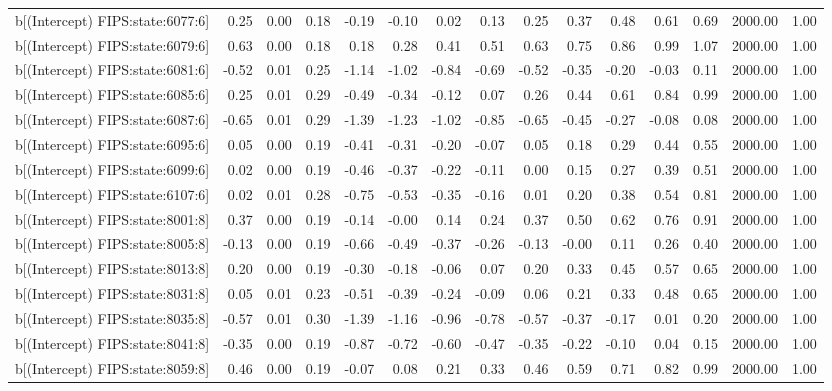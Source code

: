 \begin{table}[ht]
\begin{tabular}{rrrrrrrrrrrrrrr}
  b[(Intercept) FIPS:state:6077:6] & 0.25 & 0.00 & 0.18 & -0.19 & -0.10 & 0.02 & 0.13 & 0.25 & 0.37 & 0.48 & 0.61 & 0.69 & 2000.00 & 1.00 \\ 
  b[(Intercept) FIPS:state:6079:6] & 0.63 & 0.00 & 0.18 & 0.18 & 0.28 & 0.41 & 0.51 & 0.63 & 0.75 & 0.86 & 0.99 & 1.07 & 2000.00 & 1.00 \\ 
  b[(Intercept) FIPS:state:6081:6] & -0.52 & 0.01 & 0.25 & -1.14 & -1.02 & -0.84 & -0.69 & -0.52 & -0.35 & -0.20 & -0.03 & 0.11 & 2000.00 & 1.00 \\ 
  b[(Intercept) FIPS:state:6085:6] & 0.25 & 0.01 & 0.29 & -0.49 & -0.34 & -0.12 & 0.07 & 0.26 & 0.44 & 0.61 & 0.84 & 0.99 & 2000.00 & 1.00 \\ 
  b[(Intercept) FIPS:state:6087:6] & -0.65 & 0.01 & 0.29 & -1.39 & -1.23 & -1.02 & -0.85 & -0.65 & -0.45 & -0.27 & -0.08 & 0.08 & 2000.00 & 1.00 \\ 
  b[(Intercept) FIPS:state:6095:6] & 0.05 & 0.00 & 0.19 & -0.41 & -0.31 & -0.20 & -0.07 & 0.05 & 0.18 & 0.29 & 0.44 & 0.55 & 2000.00 & 1.00 \\ 
  b[(Intercept) FIPS:state:6099:6] & 0.02 & 0.00 & 0.19 & -0.46 & -0.37 & -0.22 & -0.11 & 0.00 & 0.15 & 0.27 & 0.39 & 0.51 & 2000.00 & 1.00 \\ 
  b[(Intercept) FIPS:state:6107:6] & 0.02 & 0.01 & 0.28 & -0.75 & -0.53 & -0.35 & -0.16 & 0.01 & 0.20 & 0.38 & 0.54 & 0.81 & 2000.00 & 1.00 \\ 
  b[(Intercept) FIPS:state:8001:8] & 0.37 & 0.00 & 0.19 & -0.14 & -0.00 & 0.14 & 0.24 & 0.37 & 0.50 & 0.62 & 0.76 & 0.91 & 2000.00 & 1.00 \\ 
  b[(Intercept) FIPS:state:8005:8] & -0.13 & 0.00 & 0.19 & -0.66 & -0.49 & -0.37 & -0.26 & -0.13 & -0.00 & 0.11 & 0.26 & 0.40 & 2000.00 & 1.00 \\ 
  b[(Intercept) FIPS:state:8013:8] & 0.20 & 0.00 & 0.19 & -0.30 & -0.18 & -0.06 & 0.07 & 0.20 & 0.33 & 0.45 & 0.57 & 0.65 & 2000.00 & 1.00 \\ 
  b[(Intercept) FIPS:state:8031:8] & 0.05 & 0.01 & 0.23 & -0.51 & -0.39 & -0.24 & -0.09 & 0.06 & 0.21 & 0.33 & 0.48 & 0.65 & 2000.00 & 1.00 \\ 
  b[(Intercept) FIPS:state:8035:8] & -0.57 & 0.01 & 0.30 & -1.39 & -1.16 & -0.96 & -0.78 & -0.57 & -0.37 & -0.17 & 0.01 & 0.20 & 2000.00 & 1.00 \\ 
  b[(Intercept) FIPS:state:8041:8] & -0.35 & 0.00 & 0.19 & -0.87 & -0.72 & -0.60 & -0.47 & -0.35 & -0.22 & -0.10 & 0.04 & 0.15 & 2000.00 & 1.00 \\ 
  b[(Intercept) FIPS:state:8059:8] & 0.46 & 0.00 & 0.19 & -0.07 & 0.08 & 0.21 & 0.33 & 0.46 & 0.59 & 0.71 & 0.82 & 0.99 & 2000.00 & 1.00 \\ 

\end{tabular}
\end{table}
